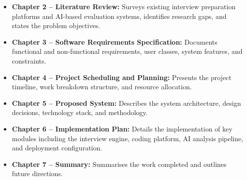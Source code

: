 \begin{itemize}
    \item \textbf{Chapter 2 -- Literature Review:} Surveys existing interview preparation platforms and AI-based evaluation systems, identifies research gaps, and states the problem objectives.
    \item \textbf{Chapter 3 -- Software Requirements Specification:} Documents functional and non-functional requirements, user classes, system features, and constraints.
    \item \textbf{Chapter 4 -- Project Scheduling and Planning:} Presents the project timeline, work breakdown structure, and resource allocation.
    \item \textbf{Chapter 5 -- Proposed System:} Describes the system architecture, design decisions, technology stack, and methodology.
    \item \textbf{Chapter 6 -- Implementation Plan:} Details the implementation of key modules including the interview engine, coding platform, AI analysis pipeline, and deployment configuration.
    \item \textbf{Chapter 7 -- Summary:} Summarises the work completed and outlines future directions.
\end{itemize}
